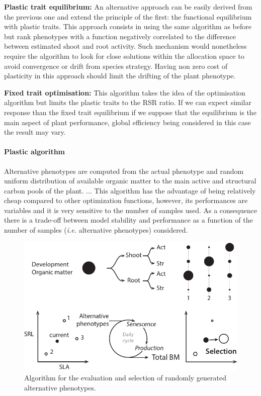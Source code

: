 \textbf{Plastic trait equilibrium:} An alternative approach can be easily derived from the previous one and extend the principle of the first: the functional equilibrium with plastic traits. This approach consists in using the same algorithm as before but rank phenotypes with a function negatively correlated to the difference between estimated shoot and root activity. Such mechanism would nonetheless require the algorithm to look for close solutions within the allocation space to avoid convergence or drift from species strategy. Having non zero cost of plasticity in this approach should limit the drifting of the plant phenotype.

\textbf{Fixed trait optimisation:} This algorithm takes the idea of the optimisation algorithm but limits the plastic traits to the RSR ratio. If we can expect similar response than the fixed trait equilibrium if we suppose that the equilibrium is the main aspect of plant performance, global efficiency being considered in this case the result may vary.

\paragraph{Plastic algorithm}

Alternative phenotypes are computed from the actual phenotype and random uniform distribution of available organic matter to the main active and structural carbon pools of the plant. ... This algorithm has the advantage of being relatively cheap compared to other optimization functions, however, its performances are variables and it is very sensitive to the number of samples used. As a consequence there is a trade-off between model stability and performance as a function of the number of samples (\textit{i.e.} alternative phenotypes) considered.
\begin{figure}
\includegraphics{./Figures/phenotype_ranking_t.pdf}
\caption{Algorithm for the evaluation and selection of randomly generated alternative phenotypes.}
\end{figure}


